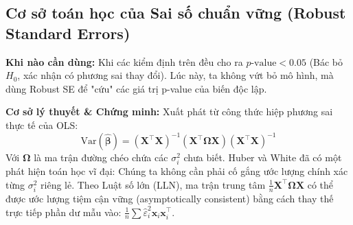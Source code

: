 	\subsection{Cơ sở toán học của Sai số chuẩn vững (Robust Standard Errors)}
	\textbf{Khi nào cần dùng:} Khi các kiểm định trên đều cho ra $p\text{-value} < 0.05$ (Bác bỏ $H_0$, xác nhận có phương sai thay đổi). Lúc này, ta không vứt bỏ mô hình, mà dùng Robust SE để "cứu" các giá trị p-value của biến độc lập.
	
	\textbf{Cơ sở lý thuyết \& Chứng minh:} Xuất phát từ công thức hiệp phương sai thực tế của OLS:
	\begin{equation}
		\text{Var}(\hat{\boldsymbol{\beta}}) = (\mathbf{X}^{\top}\mathbf{X})^{-1} (\mathbf{X}^{\top} \boldsymbol{\Omega} \mathbf{X}) (\mathbf{X}^{\top}\mathbf{X})^{-1}
	\end{equation}
	Với $\boldsymbol{\Omega}$ là ma trận đường chéo chứa các $\sigma_i^2$ chưa biết. Huber \cite{huber1967} và White \cite{white1980} đã có một phát hiện toán học vĩ đại: Chúng ta không cần phải cố gắng ước lượng chính xác từng $\sigma_i^2$ riêng lẻ. Theo Luật số lớn (LLN), ma trận trung tâm $\frac{1}{n} \mathbf{X}^{\top} \boldsymbol{\Omega} \mathbf{X}$ có thể được ước lượng tiệm cận vững (asymptotically consistent) bằng cách thay thế trực tiếp phần dư mẫu vào: $\frac{1}{n} \sum \hat{\varepsilon}_i^2 \mathbf{x}_i \mathbf{x}_i^{\top}$.
	
